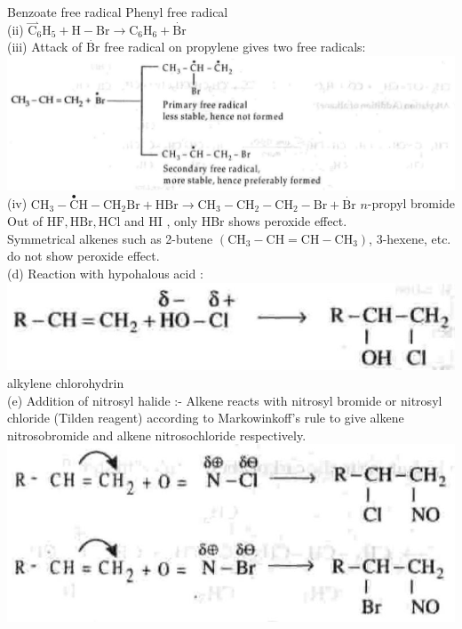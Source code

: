 \documentclass[10pt]{article}
\begin{document}
Benzoate free radical Phenyl free radical\\
(ii) $\stackrel{\rightharpoonup}{\mathrm{C}}_{6} \mathrm{H}_{5}+\mathrm{H}-\mathrm{Br} \longrightarrow \mathrm{C}_{6} \mathrm{H}_{6}+\dot{\mathrm{Br}}$\\
(iii) Attack of $\dot{\mathrm{Br}}$ free radical on propylene gives two free radicals:\\
\includegraphics[max width=\textwidth, center]{2025_01_28_8470952b98110cec3aabg-181(5)}\\
(iv) $\mathrm{CH}_{3}-\stackrel{\bullet}{\mathrm{C}} \mathrm{H}-\mathrm{CH}_{2} \mathrm{Br}+\mathrm{HBr} \longrightarrow \mathrm{CH}_{3}-\mathrm{CH}_{2}-\mathrm{CH}_{2}-\mathrm{Br}+\dot{\mathrm{Br}}$ $n$-propyl bromide\\
Out of $\mathrm{HF}, \mathrm{HBr}, \mathrm{HCl}$ and HI , only HBr shows peroxide effect.\\
Symmetrical alkenes such as 2-butene $\left(\mathrm{CH}_{3}-\mathrm{CH}=\mathrm{CH}-\mathrm{CH}_{3}\right)$, 3-hexene, etc. do not show peroxide effect.\\
(d) Reaction with hypohalous acid :\\
\includegraphics[max width=\textwidth, center]{2025_01_28_8470952b98110cec3aabg-181(1)}\\
alkylene chlorohydrin\\
(e) Addition of nitrosyl halide :- Alkene reacts with nitrosyl bromide or nitrosyl chloride (Tilden reagent) according to Markowinkoff's rule to give alkene nitrosobromide and alkene nitrosochloride respectively.\\
\includegraphics[max width=\textwidth, center]{2025_01_28_8470952b98110cec3aabg-181(4)}\\
\end{document}
